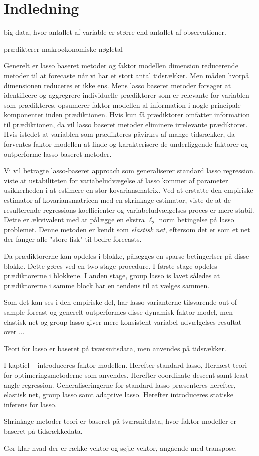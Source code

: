 \chapter{Indledning}

big data, hvor antallet af variable er større end antallet af observationer.

prædikterer makroøkonomiske nøgletal

Generelt er lasso baseret metoder og faktor modellen dimension reducerende metoder til at forecaste når vi har et stort antal tidsrækker.
Men måden hvorpå dimensionen reduceres er ikke ens.
Mens lasso baseret metoder forsøger at identificere og aggregrere individuelle prædiktorer som er relevante for variablen som prædikteres, opsumerer faktor modellen al information i nogle principale komponenter inden prædiktionen.
Hvis kun få prædiktorer omfatter information til prædiktionen, da vil lasso baseret metoder eliminere irrelevante prædiktorer.
Hvis istedet at variablen som prædikteres påvirkes af mange tidsrækker, da forventes faktor modellen at finde og karakterisere de underliggende faktorer og outperforme lasso baseret metoder.


Vi vil betragte lasso-baseret approach som generaliserer standard lasso regression.
\citep{zou_hastie} viste at ustabiliteten for variabeludvægelse af lasso kommer af parameter usikkerheden i at estimere en stor kovariansmatrix.
Ved at erstatte den empiriske estimator af kovariansmatricen med en skrinkage estimator, viste de at de resulterende regressions koefficienter og variabeludvælgelses proces er mere stabil.
Dette er ækvivalent med at pålægge en ekstra \(\ell_2\) norm betingelse på lasso problemet.
Denne metoden er kendt som \textit{elastisk net}, eftersom det er som et net der fanger alle "store fisk" til bedre forecasts.

Da prædiktorerne kan opdeles i blokke, pålægges en sparse betingerlser på disse blokke.
Dette gøres ved en two-stage procedure.
I første stage opdeles prædiktorerne i blokkene. I anden stage, group lasso \citep{group_lasso} is lavet således at prædiktorerne i samme block har en tendens til at vælges sammen.

Som det kan ses i den empiriske del, har lasso varianterne tilsvarende out-of-sample forcast og generelt outperformes disse dynamisk faktor model, men elastisk net og group lasso giver mere konsistent variabel udvælgelses resultat over ...


Teori for lasso er baseret på tværsnitsdata, men anvendes på tidsrækker.


I kaptiel -- introduceres faktor modellen.
Herefter standard lasso,
Hernæst teori for optimeringsmetoderne som anvendes.
Herefter coordinate descent samt least angle regression.
Generaliseringerne for standard lasso præsenteres herefter, elastisk net, group lasso samt adaptive lasso.
Herefter introduceres statiske inferens for lasso.

Shrinkage metoder teori er baseret på tværsnitdata, hvor faktor modeller er baseret på tidsrækkedata. 

Gør klar hvad der er række vektor og søjle vektor, angående med transpose.  